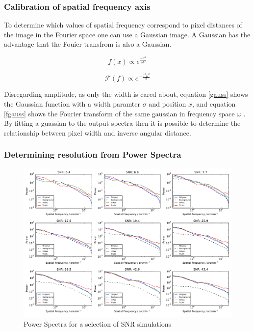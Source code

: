 
\subsubsection{Calibration of spatial frequency axis}

To determine which values of spatial frequency correspond to pixel distances of the image in the Fourier space one can use a Gaussian image. A Gaussian has the advantage that the Fouier transfrom is also a Gaussian.

\begin{equation}
    f(x) \propto e^{\frac{-x^2}{2\sigma^2}}
    \label{gauss}
\end{equation}

\begin{equation}
    \mathscr{F}(f) \propto e^{-\frac{\sigma^2\omega^2}{2}}
    \label{fgauss}
\end{equation}

Disregarding amplitude, as only the width is cared about, equation \ref{gauss} shows the Gaussian function with a width paramter $\sigma$ and position $x$, and equation \ref{fgauss} shows the Fourier transform of the same gaussian in frequency space $\omega$ \citep{ozaktas2001fractional}. By fitting a guassian to the output spectra then it is possible to determine the relationship between pixel width and inverse angular distance.

\subsubsection{Determining resolution from Power Spectra}

\begin{figure}
    \centering
    \includegraphics[width=0.9\linewidth]{figures/power-spectra.pdf}
    \caption[Power Spectra]{Power Spectra for a selection of SNR simulations}
    \label{pspectra}
\end{figure}

